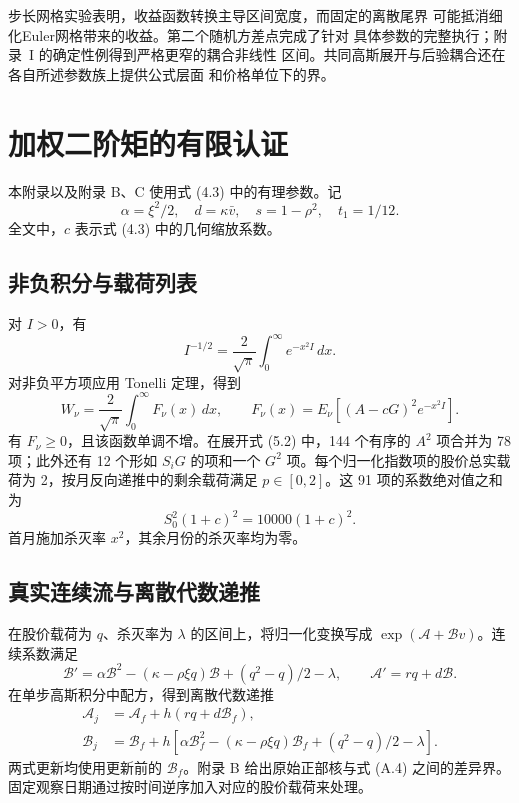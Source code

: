 步长网格实验表明，收益函数转换主导区间宽度，而固定的离散尾界
可能抵消细化Euler网格带来的收益。第二个随机方差点完成了针对
具体参数的完整执行；附录~I 的确定性例得到严格更窄的耦合非线性
区间。共同高斯展开与后验耦合还在各自所述参数族上提供公式层面
和价格单位下的界。
\appendix


\section{加权二阶矩的有限认证}

本附录以及附录 B、C 使用式 (4.3) 中的有理参数。记
\[
\alpha=\xi^2/2,\quad d=\kappa\bar v,\quad
s=1-\rho^2,\quad t_1=1/12.
\]
全文中，\(c\) 表示式 (4.3) 中的几何缩放系数。

\subsection{非负积分与载荷列表}

对 \(I>0\)，有
\[
I^{-1/2}=\frac2{\sqrt\pi}\int_0^\infty e^{-x^2I}\,dx.
\]
对非负平方项应用 Tonelli 定理，得到
\[
W_\nu=\frac2{\sqrt\pi}\int_0^\infty F_\nu(x)\,dx,\qquad
F_\nu(x)=E_\nu[(A-cG)^2e^{-x^2I}].
\tag{A.1}
\]
有 \(F_\nu\ge0\)，且该函数单调不增。在展开式 (5.2) 中，144 个有序的 \(A^2\) 项合并为 78 项；此外还有 12 个形如 \(S_iG\) 的项和一个 \(G^2\) 项。每个归一化指数项的股价总实载荷为 2，按月反向递推中的剩余载荷满足 \(p\in[0,2]\)。这 91 项的系数绝对值之和为
\[
S_0^2(1+c)^2=10000(1+c)^2.
\tag{A.2}
\]
首月施加杀灭率 \(x^2\)，其余月份的杀灭率均为零。

\subsection{真实连续流与离散代数递推}

在股价载荷为 \(q\)、杀灭率为 \(\lambda\) 的区间上，将归一化变换写成 \(\exp(\mathcal A+\mathcal Bv)\)。连续系数满足
\[
\mathcal B'=\alpha\mathcal B^2-(\kappa-\rho\xi q)\mathcal B+
(q^2-q)/2-\lambda,\qquad
\mathcal A'=rq+d\mathcal B.
\tag{A.3}
\]
在单步高斯积分中配方，得到离散代数递推
\[
\begin{aligned}
\mathcal A_j&=\mathcal A_f+h(rq+d\mathcal B_f),\\
\mathcal B_j&=\mathcal B_f+h\left[
\alpha\mathcal B_f^2-(\kappa-\rho\xi q)\mathcal B_f+
(q^2-q)/2-\lambda\right].
\end{aligned}
\tag{A.4}
\]
两式更新均使用更新前的 \(\mathcal B_f\)。附录 B 给出原始正部核与式 (A.4) 之间的差异界。固定观察日期通过按时间逆序加入对应的股价载荷来处理。

